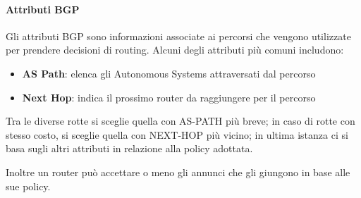 \paragraph{Attributi BGP}
Gli attributi BGP sono informazioni associate ai percorsi che vengono utilizzate per prendere decisioni di routing. Alcuni degli attributi più comuni includono:
\begin{itemize}
    \item \textbf{AS Path}: elenca gli Autonomous Systems attraversati dal percorso
    \item \textbf{Next Hop}: indica il prossimo router da raggiungere per il percorso
\end{itemize}
Tra le diverse rotte si sceglie quella con AS-PATH più breve; in caso di rotte
con stesso costo, si sceglie quella con NEXT-HOP più vicino; in ultima istanza
ci si basa sugli altri attributi in relazione alla policy adottata.

Inoltre un router può accettare o meno gli annunci che gli giungono in base alle sue
policy.